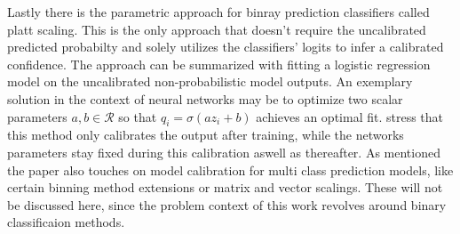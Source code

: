 Lastly there is the parametric approach for binray prediction classifiers called platt scaling. This is the only approach that doesn't require the uncalibrated predicted probabilty and solely utilizes 
the classifiers' logits to infer a calibrated confidence. The approach can be summarized with fitting a logistic regression model on the uncalibrated non-probabilistic model outputs. An exemplary 
solution in the context of neural networks may be to optimize two scalar parameters $a, b \in \mathcal{R}$ so that $\hat{q}_i = \sigma(az_i + b)$ achieves an optimal fit. \cite{Guo_2017_tempscalingetc} 
stress that this method only calibrates the output after training, while the networks parameters stay fixed during this calibration aswell as thereafter.
\newline
As mentioned the paper also touches on model calibration for multi class prediction models, like certain binning method extensions or matrix and vector scalings. These will not be discussed here, 
since the problem context of this work revolves around binary classificaion methods.




